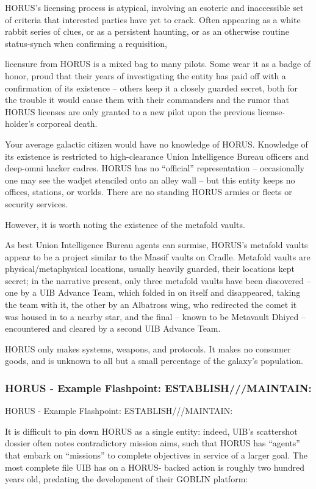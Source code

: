 HORUS’s licensing process is atypical, involving an esoteric and inaccessible set of criteria that
interested parties have yet to crack. Often appearing as a white rabbit series of clues, or as a
persistent haunting, or as an otherwise routine status-synch when confirming a requisition,




licensure from HORUS is a mixed bag to many pilots. Some wear it as a badge of honor, proud
that their years of investigating the entity has paid off with a confirmation of its existence -- others
keep it a closely guarded secret, both for the trouble it would cause them with their commanders
and the rumor that HORUS licenses are only granted to a new pilot upon the previous license-
holder’s corporeal death.

Your average galactic citizen would have no knowledge of HORUS. Knowledge of its existence is
restricted to high-clearance Union Intelligence Bureau officers and deep-omni hacker cadres.
HORUS has no “official” representation -- occasionally one may see the wadjet stenciled onto an
alley wall -- but this entity keeps no offices, stations, or worlds. There are no standing HORUS
armies or fleets or security services.

However, it is worth noting the existence of the metafold vaults.

As best Union Intelligence Bureau agents can surmise, HORUS’s metafold vaults appear to be a
project similar to the Massif vaults on Cradle. Metafold vaults are physical/metaphysical locations,
usually heavily guarded, their locations kept secret; in the narrative present, only three metafold
vaults have been discovered -- one by a UIB Advance Team, which folded in on itself and
disappeared, taking the team with it, the other by an Albatross wing, who redirected the comet it
was housed in to a nearby star, and the final -- known to be Metavault Dhiyed -- encountered and
cleared by a second UIB Advance Team.

HORUS only makes systems, weapons, and protocols. It makes no consumer goods, and is
unknown to all but a small percentage of the galaxy’s population.

\subsubsection{HORUS - Example Flashpoint: ESTABLISH///MAINTAIN:}
HORUS - Example Flashpoint: ESTABLISH///MAINTAIN:

It is difficult to pin down HORUS as a single entity: indeed, UIB’s scattershot dossier often notes
contradictory mission aims, such that HORUS has “agents” that embark on “missions” to
complete objectives in service of a larger goal. The most complete file UIB has on a HORUS-
backed action is roughly two hundred years old, predating the development of their GOBLIN
platform:


